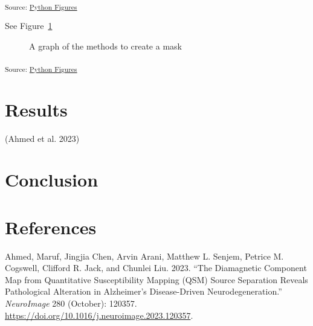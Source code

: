 \documentclass[
sn-nature
]{sn-jnl}
\newlength{\cslhangindent}
\newenvironment{CSLReferences}[2] %
 {\begin{list}{}{%
  \setlength{\itemindent}{0pt}
  \setlength{\leftmargin}{0pt}
  \setlength{\parsep}{0pt}
  \ifodd #1
   \setlength{\leftmargin}{\cslhangindent}
   \setlength{\itemindent}{-1\cslhangindent}
  \fi
  \setlength{\itemsep}{#2\baselineskip}}}
 {\end{list}}
\begin{document}
\textsubscript{Source:
\href{https://WeberLab.github.io/Chisep_CSVO2_Manuscript/notebooks/Figures.ipynb.html\#cell-fig-sample}{Python
Figures}}

See Figure~\ref{fig-graph}

\begin{figure}[H]


\caption{\label{fig-graph}A graph of the methods to create a mask}

\end{figure}%

\textsubscript{Source:
\href{https://WeberLab.github.io/Chisep_CSVO2_Manuscript/notebooks/Figures.ipynb.html\#cell-fig-graph}{Python
Figures}}

\section{Results}\label{sec-results}

(Ahmed et al. 2023)

\section{Conclusion}\label{sec-conclusion}

\section*{References}\label{references}

\label{refs}
\begin{CSLReferences}{1}{0}
Ahmed, Maruf, Jingjia Chen, Arvin Arani, Matthew L. Senjem, Petrice M.
Cogswell, Clifford R. Jack, and Chunlei Liu. 2023. {``The Diamagnetic
Component Map from Quantitative Susceptibility Mapping ({QSM}) Source
Separation Reveals Pathological Alteration in {Alzheimer}'s
Disease-Driven Neurodegeneration.''} \emph{NeuroImage} 280 (October):
120357. \url{https://doi.org/10.1016/j.neuroimage.2023.120357}.

\end{CSLReferences}
\end{document}
